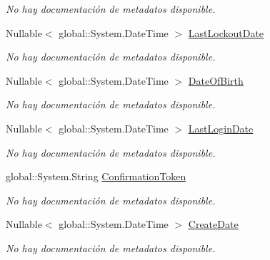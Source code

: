 \begin{DoxyCompactItemize}
\begin{DoxyCompactList}\small\item\em No hay documentación de metadatos disponible. \end{DoxyCompactList}\item 
Nullable$<$ global\-::\-System.\-Date\-Time $>$ \hyperlink{class_game_memory_1_1_users_aac14661b4cd2906d5d4699b9b1b6fea8}{Last\-Lockout\-Date}
\begin{DoxyCompactList}\small\item\em No hay documentación de metadatos disponible. \end{DoxyCompactList}\item 
Nullable$<$ global\-::\-System.\-Date\-Time $>$ \hyperlink{class_game_memory_1_1_users_a7c3fd7829e1bcff44f1ddf93163c7a7e}{Date\-Of\-Birth}
\begin{DoxyCompactList}\small\item\em No hay documentación de metadatos disponible. \end{DoxyCompactList}\item 
Nullable$<$ global\-::\-System.\-Date\-Time $>$ \hyperlink{class_game_memory_1_1_users_abb9ebf3a6108d29f1eea6eec2142b3d1}{Last\-Login\-Date}
\begin{DoxyCompactList}\small\item\em No hay documentación de metadatos disponible. \end{DoxyCompactList}\item 
global\-::\-System.\-String \hyperlink{class_game_memory_1_1_users_aae1d5f9c95e32efb79d2d1a5ec2e76f9}{Confirmation\-Token}
\begin{DoxyCompactList}\small\item\em No hay documentación de metadatos disponible. \end{DoxyCompactList}\item 
Nullable$<$ global\-::\-System.\-Date\-Time $>$ \hyperlink{class_game_memory_1_1_users_ad285931a74d022fafbd9299b88e2125a}{Create\-Date}
\begin{DoxyCompactList}\small\item\em No hay documentación de metadatos disponible. \end{DoxyCompactList}\item 

\end{DoxyCompactItemize}
